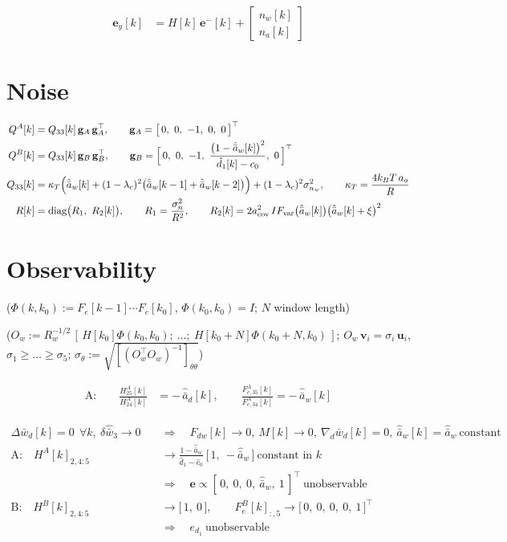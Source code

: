 \documentclass[11pt,a4paper,fontset=none]{ctexart}
\newcommand{\ba}{\bar{a}}
\newcommand{\bw}{\bar{w}}
\newcommand{\ah}{\hat{\ba}_w}
\newcommand{\ch}{\hat{c}_0}
\newcommand{\dhat}{\hat{d}_1}
\newcommand{\ad}{\hat{\ba}_d}
\begin{document}
\begin{align*}
\mathbf{e}_y[k] &= H[k]\,\mathbf{e}^{-}[k] + \begin{bmatrix} n_w[k] \\ n_a[k] \end{bmatrix}
\end{align*}

\section{Noise}

\begin{align*}
Q^{A}[k]  &= Q_{33}[k]\,\mathbf{g}_A\,\mathbf{g}_A^{\top}, \qquad \mathbf{g}_A = \bigl[\,0,\ 0,\ -1,\ 0,\ 0\,\bigr]^{\top} \\
Q^{B}[k]  &= Q_{33}[k]\,\mathbf{g}_B\,\mathbf{g}_B^{\top}, \qquad
\mathbf{g}_B = \Bigl[\,0,\ 0,\ -1,\ \frac{\bigl(1-\ah[k]\bigr)^{2}}{\dhat[k] - c_0},\ 0\,\Bigr]^{\top} \\
Q_{33}[k] &= \kappa_T\Bigl(\ah[k] + (1-\lambda_c)^{2}\bigl(\ah[k-1] + \ah[k-2]\bigr)\Bigr) + (1-\lambda_c)^{2}\sigma^{2}_{n_w},
\qquad \kappa_T = \frac{4k_BT\,a_o}{R} \\
R[k]      &= \mathrm{diag}\bigl(R_1,\ R_2[k]\bigr), \qquad R_1 = \frac{\sigma^{2}_{n}}{R^{2}}, \qquad
R_2[k] = 2a_{\mathrm{cov}}^{2}\,IF_{\mathrm{var}}\bigl(\ah[k]\bigr)\bigl(\ah[k] + \xi\bigr)^{2}
\end{align*}

\clearpage
\section{Observability}

($\Phi(k,k_0) := F_e[k-1]\cdots F_e[k_0]$, $\Phi(k_0,k_0) = I$; $N$ window length)

($O_w := R_w^{-1/2}\,[\,H[k_0]\Phi(k_0,k_0);\ \dots;\ H[k_0+N]\Phi(k_0+N,k_0)\,]$;
$O_w\,\mathbf{v}_i = \sigma_i\,\mathbf{u}_i$, $\sigma_1 \ge \dots \ge \sigma_5$;
$\sigma_\theta := \sqrt{[(O_w^{\top}O_w)^{-1}]_{\theta\theta}}$)

\begin{align*}
\text{A:}\qquad
\frac{H^{A}_{25}[k]}{H^{A}_{24}[k]} &= -\,\ad[k], \qquad
\frac{F^{A}_{e,35}[k]}{F^{A}_{e,34}[k]} = -\,\ah[k]
\end{align*}

\begin{align*}
\Delta\bw_d[k] = 0 \ \ \forall k,\ \delta\hat{\bw}_3 \to 0 \quad&\Longrightarrow\quad
F_{dw}[k] \to 0,\ M[k] \to 0,\ \nabla_d\bw_d[k] = 0,\ \ah[k] = \ah\ \text{constant} \\
\text{A:}\quad H^{A}[k]_{2,4:5} &\to \frac{1-\ah}{\dhat - \ch}\,\bigl[\,1,\ -\ah\,\bigr] \ \text{constant in } k \\
&\Longrightarrow\quad \mathbf{e} \propto [\,0,\ 0,\ 0,\ \ah,\ 1\,]^{\top} \ \text{unobservable} \\
\text{B:}\quad H^{B}[k]_{2,4:5} &\to \bigl[\,1,\ 0\,\bigr], \qquad F_e^{B}[k]_{:,5} \to \bigl[\,0,\ 0,\ 0,\ 0,\ 1\,\bigr]^{\top} \\
&\Longrightarrow\quad e_{d_1} \ \text{unobservable}
\end{align*}
\end{document}
